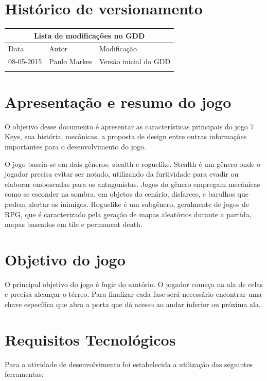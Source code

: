 \documentclass{article}
\begin{document}

\onehalfspacing
\tableofcontents
\pagebreak
\section{Histórico de versionamento}
\begin{longtable}{|l|l|l|}
\hline
\multicolumn{3}{|c|}{Lista de modificações no GDD}
\\
\hline
Data & Autor & Modificação
\\
\hline
08-05-2015 & Paulo Markes & Versão inicial do GDD
\\
\hline
\\
\hline
\end{longtable}
\newpage
\section{Apresentação e resumo do jogo}
     O objetivo desse documento é apresentar as características principais do jogo 7 Keys, sua história, mecânicas, a proposta de design entre outras informações importantes para o desenvolvimento do jogo.
     
     O jogo baseia-se em dois gêneros: stealth e roguelike. Stealth é um gênero onde o jogador precisa evitar ser notado, utilizando da furtividade para evadir ou elaborar emboscadas para os antagonistas. Jogos do gênero empregam mecânicas como se esconder na sombra, em objetos do cenário, disfarces, e barulhos que podem alertar os inimigos. Roguelike é um subgênero, geralmente de jogos de RPG, que é caracterizado pela geração de mapas aleatórios durante a partida, mapas baseados em tile e permanent death.

\section{Objetivo do jogo}
O principal objetivo do jogo é fugir do santório. O jogador começa na ala de celas e precisa alcançar o térreo. Para finalizar cada fase será necessário encontrar uma chave específica que abra a porta que dá acesso ao andar inferior ou próxima ala.
 
\section{Requisitos Tecnológicos}
Para a atividade de desenvolvimento foi estabelecida a utilização das seguintes ferramentas:
\end{document}
